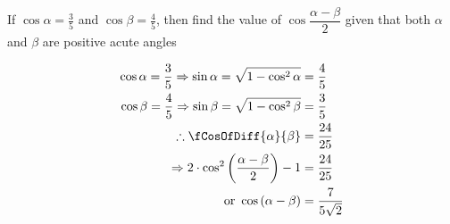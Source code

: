 
\question[3] If $\cos\alpha = \frac{3}{5}$ and $\cos\beta = \frac{4}{5}$, then find the 
value of $\cos\dfrac{\alpha-\beta}{2}$ given that both $\alpha$ and $\beta$ are positive
acute angles


\ifprintanswers
\fi 

\begin{solution}[\halfpage]
	\begin{align}
	   \cos\alpha = \dfrac{3}{5} \Rightarrow \sin\alpha = \sqrt{1-\cos^2\alpha} &= \dfrac{4}{5} \\
	   \cos\beta = \dfrac{4}{5} \Rightarrow \sin\beta = \sqrt{1-\cos^2\beta} &= \dfrac{3}{5} \\
	   \therefore \fCosOfDiff{\alpha}{\beta} &= \dfrac{24}{25} \\
	   \Rightarrow 2\cdot\cos^2\left( \dfrac{\alpha-\beta}{2}\right) - 1 &= \dfrac{24}{25} \\
	   \text{ or } \cos\left(\alpha-\beta \right) &= \dfrac{7}{5\sqrt2}
	\end{align}
\end{solution}
